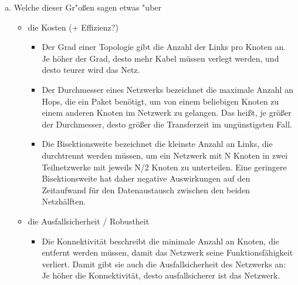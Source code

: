 \begin{enumerate}[(a)]
        \item Welche dieser Gr"o{\ss}en sagen etwas "uber
            \begin{itemize}
                \item die Kosten (+ Effizienz?)
                    \begin{itemize}
                        \item Der Grad einer Topologie gibt die Anzahl der
                            Links pro Knoten an. Je höher der Grad, desto mehr
                            Kabel müssen verlegt werden, und desto teurer wird
                            das Netz.
                        \item Der Durchmesser eines Netzwerks bezeichnet die
                            maximale Anzahl an Hops, die ein Paket benötigt, um
                            von einem beliebigen Knoten zu einem anderen Knoten
                            im Netzwerk zu gelangen. Das hei{\ss}t, je größer
                            der Durchmesser, desto größer die Transferzeit im
                            ungünstigsten Fall.
                        \item Die Bisektionsweite bezeichnet die kleinste
                            Anzahl an Links, die durchtrennt werden müssen, um
                            ein Netzwerk mit N Knoten in zwei Teilnetzwerke mit
                            jeweils N/2 Knoten zu unterteilen. Eine geringere
                            Bisektionsweite hat daher negative Auswirkungen auf
                            den Zeitaufwand für den Datenaustausch zwischen den
                            beiden Netzhälften.
                    \end{itemize}
                \item die Ausfallsicherheit / Robustheit
                    \begin{itemize}
                        \item Die Konnektivität beschreibt die minimale Anzahl
                            an Knoten, die entfernt werden müssen, damit das
                            Netzwerk seine Funktionsfähigkeit verliert. Damit
                            gibt sie auch die Ausfallsicherheit des Netzwerks
                            an: Je höher die Konnektivität, desto
                            ausfallsicherer ist das Netzwerk.
                    \end{itemize}
            \end{itemize}
\end{enumerate}
